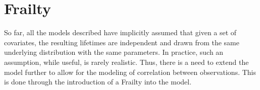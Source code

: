 





\section*{Frailty}

So far, all the models described have implicitly assumed that given a set of covariates, the resulting lifetimes are independent and drawn from the same underlying distribution with the same parameters. In practice, such an assumption, while useful, is rarely realistic. Thus, there is a need to extend the model further to allow for the modeling of correlation between observations. This is done through the introduction of a Frailty into the model.

